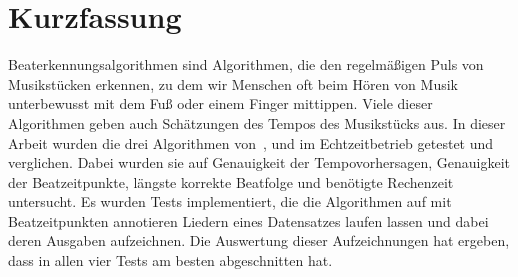 \chapter*{Kurzfassung}

Beaterkennungsalgorithmen sind Algorithmen,
	die den regelmä{\ss}igen Puls von Musikstücken erkennen,
	zu dem wir Menschen oft beim Hören von Musik unterbewusst mit dem Fu{\ss} oder einem Finger mittippen.
Viele dieser Algorithmen geben auch Schätzungen des Tempos des Musikstücks aus.
In dieser Arbeit wurden die drei Algorithmen
	von~\cite{2001_BeatThis}, \cite{2009_DaPlSt} und \cite{2011_PlRoSt}
	im Echtzeitbetrieb getestet und verglichen.
Dabei wurden sie auf
	Genauigkeit der Tempovorhersagen, Genauigkeit der Beatzeitpunkte, längste korrekte Beatfolge und benötigte Rechenzeit
	untersucht.
Es wurden Tests implementiert,
	die die Algorithmen auf mit Beatzeitpunkten annotieren Liedern eines Datensatzes laufen lassen
	und dabei deren Ausgaben aufzeichnen.
Die Auswertung dieser Aufzeichnungen hat ergeben,
	dass \cite{2009_DaPlSt} in allen vier Tests am besten abgeschnitten hat.
